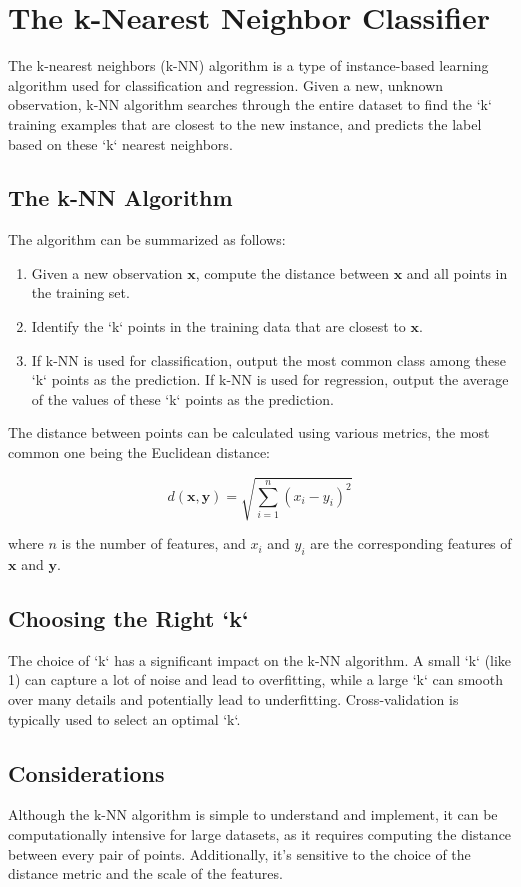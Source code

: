 \chapter{The k-Nearest Neighbor Classifier}

The k-nearest neighbors (k-NN) algorithm is a type of instance-based learning algorithm used for classification and regression. Given a new, unknown observation, k-NN algorithm searches through the entire dataset to find the `k` training examples that are closest to the new instance, and predicts the label based on these `k` nearest neighbors.

\section{The k-NN Algorithm}

The algorithm can be summarized as follows:

\begin{enumerate}
    \item Given a new observation $\mathbf{x}$, compute the distance between $\mathbf{x}$ and all points in the training set.
    \item Identify the `k` points in the training data that are closest to $\mathbf{x}$.
    \item If k-NN is used for classification, output the most common class among these `k` points as the prediction. If k-NN is used for regression, output the average of the values of these `k` points as the prediction.
\end{enumerate}

The distance between points can be calculated using various metrics, the most common one being the Euclidean distance:

\[
d(\mathbf{x}, \mathbf{y}) = \sqrt{\sum_{i=1}^{n}(x_i - y_i)^2}
\]

where $n$ is the number of features, and $x_i$ and $y_i$ are the corresponding features of $\mathbf{x}$ and $\mathbf{y}$.

\section{Choosing the Right `k`}

The choice of `k` has a significant impact on the k-NN algorithm. A small `k` (like 1) can capture a lot of noise and lead to overfitting, while a large `k` can smooth over many details and potentially lead to underfitting. Cross-validation is typically used to select an optimal `k`.

\section{Considerations}

Although the k-NN algorithm is simple to understand and implement, it can be computationally intensive for large datasets, as it requires computing the distance between every pair of points. Additionally, it's sensitive to the choice of the distance metric and the scale of the features.

